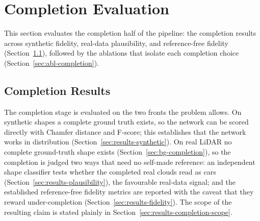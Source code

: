 

%
%
\section{Completion Evaluation}
\label{sec:completion-evaluation}

This section evaluates the completion half of the pipeline: the completion
results across synthetic fidelity, real-data plausibility, and reference-free
fidelity (Section~\ref{sec:results-completion}), followed by the ablations
that isolate each completion choice (Section~\ref{sec:abl-completion}).

\subsection{Completion Results}
\label{sec:results-completion}
\label{sec:completion-results}

The completion stage is evaluated on the two fronts the problem allows. On
synthetic shapes a complete ground truth exists, so the network can be scored
directly with Chamfer distance and F-score; this establishes that the network works in
distribution (Section~\ref{sec:results-synthetic}). On real LiDAR no complete
ground-truth shape exists (Section~\ref{sec:bg-completion}), so the completion is judged
two ways that need no self-made reference: an independent shape classifier tests whether
the completed real clouds read as cars (Section~\ref{sec:results-plausibility}), the
favourable real-data signal; and the established reference-free fidelity metrics are
reported with the caveat that they reward under-completion
(Section~\ref{sec:results-fidelity}). The scope of the resulting claim is stated plainly in
Section~\ref{sec:results-completion-scope}.

